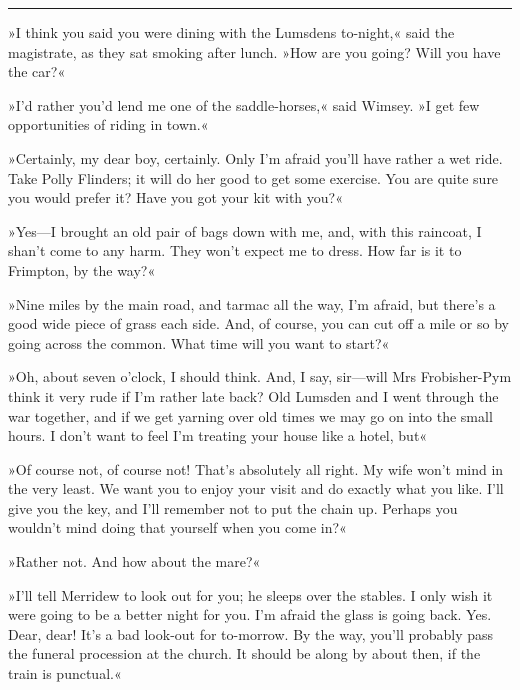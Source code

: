 \noindent\hfil\rule{0.5\textwidth}{.4pt}\hfil 

»I think you said you were dining with the Lumsdens to-night,« said the magistrate, as they sat smoking after lunch. »How are you going? Will you have the car?«

»I'd rather you'd lend me one of the saddle-horses,« said Wimsey. »I get few opportunities of riding in town.«

»Certainly, my dear boy, certainly. Only I'm afraid you'll have rather a wet ride. Take Polly Flinders; it will do her good to get some exercise. You are quite sure you would prefer it? Have you got your kit with you?«

»Yes—I brought an old pair of bags down with me, and, with this raincoat, I shan't come to any harm. They won't expect me to dress. How far is it to Frimpton, by the way?«

»Nine miles by the main road, and tarmac all the way, I'm afraid, but there's a good wide piece of grass each side. And, of course, you can cut off a mile or so by going across the common. What time will you want to start?«

»Oh, about seven o'clock, I should think. And, I say, sir—will Mrs Frobisher-Pym think it very rude if I'm rather late back? Old Lumsden and I went through the war together, and if we get yarning over old times we may go on into the small hours. I don't want to feel I'm treating your house like a hotel, but\longdash«

»Of course not, of course not! That's absolutely all right. My wife won't mind in the very least. We want you to enjoy your visit and do exactly what you like. I'll give you the key, and I'll remember not to put the chain up. Perhaps you wouldn't mind doing that yourself when you come in?«

»Rather not. And how about the mare?«

»I'll tell Merridew to look out for you; he sleeps over the stables. I only wish it were going to be a better night for you. I'm afraid the glass is going back. Yes. Dear, dear! It's a bad look-out for to-morrow. By the way, you'll probably pass the funeral procession at the church. It should be along by about then, if the train is punctual.«

